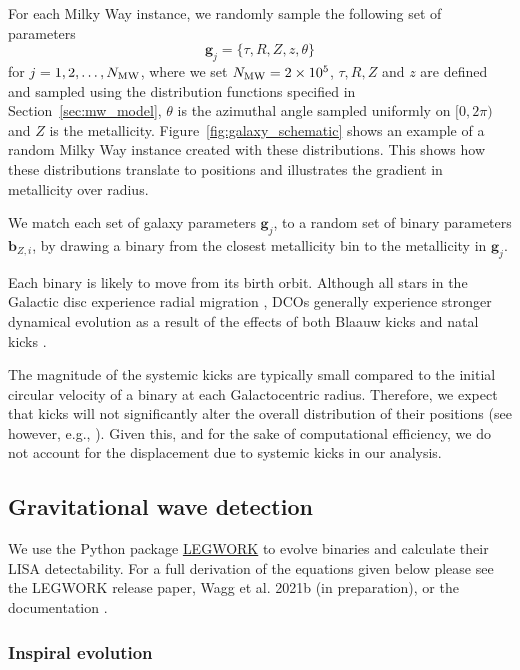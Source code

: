For each Milky Way instance, we randomly sample the following set of parameters
\begin{equation}
    \mathbf{g}_{{j}} = \{\tau, R, Z, z, \theta\}
\end{equation}
for $j = 1, 2, \dots, N_{\rm MW}$, where we set $N_{\rm MW} = 2 \times 10^{5}$, $\tau, R, Z$ and $z$ are defined and sampled using the distribution functions specified in Section~\ref{sec:mw_model}, $\theta$ is the azimuthal angle sampled uniformly on $[0, 2\pi)$ and $Z$ is the metallicity. Figure~\ref{fig:galaxy_schematic} shows an example of a random Milky Way instance created with these distributions. This shows how these distributions translate to positions and illustrates the gradient in metallicity over radius.

We match each set of galaxy parameters $\mathbf{g}_{{j}}$, to a random set of binary parameters $\mathbf{b}_{{Z, i}}$, by drawing a binary from the closest metallicity bin to the metallicity in $\mathbf{g}_{{j}}$.

Each binary is likely to move from its birth orbit. Although all stars in the Galactic disc experience radial migration \citep{Sellwood+2002, Frankel+2018}, DCOs generally experience stronger dynamical evolution as a result of the effects of both Blaauw kicks \citep{Blaauw+1961} and natal kicks \citep[e.g.][]{Hobbs+2005}.

The magnitude of the systemic kicks are typically small compared to the initial circular velocity of a binary at each Galactocentric radius. Therefore, we expect that kicks will not significantly alter the overall distribution of their positions (see however, e.g., \citealt{Brandt+1995, Abbott+2017_GW170817_progenitor}). Given this, and for the sake of computational efficiency, we do not account for the displacement due to systemic kicks in our analysis.

\subsection{Gravitational wave detection}\label{sec:gw_detection}
We use the Python package \href{https://legwork.readthedocs.io/en/latest/}{LEGWORK} to evolve binaries and calculate their LISA detectability. For a full derivation of the equations given below please see the LEGWORK release paper, Wagg et al. 2021b (in preparation), or the documentation \href{https://legwork.readthedocs.io/en/latest/notebooks/Derivations.html}{\faBook}.

\subsubsection{Inspiral evolution}


